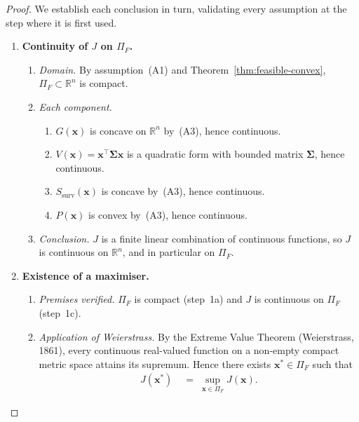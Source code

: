 \documentclass[12pt,openany]{book}
\newcommand{\bfx}{\mathbf{x}}
\numberwithin{equation}{chapter}
\theoremstyle{plain}
\theoremstyle{definition}
\theoremstyle{remark}
\numberwithin{equation}{chapter}
\theoremstyle{plain}
\newcommand{\bfSigma}{\boldsymbol{\Sigma}}
\begin{document}
\begin{proof}
We establish each conclusion in turn, validating every
assumption at the step where it is first used.

\medskip
\begin{enumerate}

\item \textbf{Continuity of $J$ on $\Pi_F$.}

\begin{enumerate}
  \item[\textup{(1a)}] \textit{Domain.}
        By assumption~(A1) and
        Theorem~\ref{thm:feasible-convex},
        $\Pi_F \subset \mathbb{R}^n$ is compact.

  \item[\textup{(1b)}] \textit{Each component.}
        \begin{enumerate}
          \item[\textup{(i)}] $G(\bfx)$ is concave on $\mathbb{R}^n$
                by~(A3), hence continuous.
          \item[\textup{(ii)}] $V(\bfx) = \bfx^\top \bfSigma \bfx$
                is a quadratic form with bounded matrix $\bfSigma$,
                hence continuous.
          \item[\textup{(iii)}] $S_{\mathrm{surv}}(\bfx)$ is concave
                by~(A3), hence continuous.
          \item[\textup{(iv)}] $P(\bfx)$ is convex by~(A3), hence
                continuous.
        \end{enumerate}

  \item[\textup{(1c)}] \textit{Conclusion.}
        $J$ is a finite linear combination of continuous functions,
        so $J$ is continuous on $\mathbb{R}^n$, and in particular
        on $\Pi_F$.
\end{enumerate}

\item \textbf{Existence of a maximiser.}

\begin{enumerate}
  \item[\textup{(2a)}] \textit{Premises verified.}
        $\Pi_F$ is compact (step~1a) and $J$ is continuous
        on $\Pi_F$ (step~1c).

  \item[\textup{(2b)}] \textit{Application of Weierstrass.}
        By the Extreme Value Theorem (Weierstrass, 1861), every
        continuous real-valued function on a non-empty compact
        metric space attains its supremum.  Hence there exists
        $\bfx^* \in \Pi_F$ such that
        \begin{align}
          J(\bfx^*) &\;=\; \sup_{\bfx \in \Pi_F} J(\bfx).
          \label{eq:existence-max}
        \end{align}


\end{enumerate}
\end{enumerate}
\end{proof}
\end{document}
